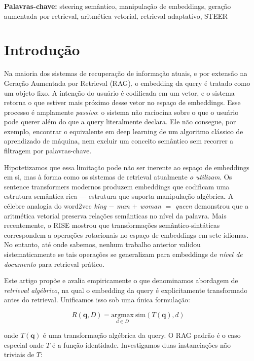 \documentclass{article}
\begin{document}
\noindent\textbf{Palavras-chave:} steering semântico, manipulação de embeddings, geração aumentada por retrieval, aritmética vetorial, retrieval adaptativo, STEER

\section{Introdução}

Na maioria dos sistemas de recuperação de informação atuais, e por extensão na Geração Aumentada por Retrieval (RAG), o embedding da query é tratado como um objeto fixo. A intenção do usuário é codificada em um vetor, e o sistema retorna o que estiver mais próximo desse vetor no espaço de embeddings. Esse processo é amplamente \emph{passivo}: o sistema não raciocina sobre o que o usuário pode querer além do que a query literalmente declara. Ele não consegue, por exemplo, encontrar o equivalente em deep learning de um algoritmo clássico de aprendizado de máquina, nem excluir um conceito semântico sem recorrer a filtragem por palavras-chave.

Hipotetizamos que essa limitação pode não ser inerente ao espaço de embeddings em si, mas à forma como os sistemas de retrieval atualmente \emph{o utilizam}. Os sentence transformers modernos produzem embeddings que codificam uma estrutura semântica rica --- estrutura que suporta manipulação algébrica. A célebre analogia do word2vec \emph{king $-$ man $+$ woman $=$ queen} \cite{mikolov2013} demonstrou que a aritmética vetorial preserva relações semânticas no nível da palavra. Mais recentemente, o RISE \cite{rise2025} mostrou que transformações semântico-sintáticas correspondem a operações rotacionais no espaço de embeddings em sete idiomas. No entanto, até onde sabemos, nenhum trabalho anterior validou sistematicamente se tais operações se generalizam para embeddings de \emph{nível de documento} para retrieval prático.

Este artigo propõe e avalia empiricamente o que denominamos abordagem de \emph{retrieval algébrico}, na qual o embedding da query é explicitamente transformado antes do retrieval. Unificamos isso sob uma única formulação:

\begin{equation}
R(\mathbf{q}, D) = \underset{d \in D}{\text{argmax}} \ \text{sim}(T(\mathbf{q}), d)
\end{equation}

onde $T(\mathbf{q})$ é uma transformação algébrica da query. O RAG padrão é o caso especial onde $T$ é a função identidade. Investigamos duas instanciações não triviais de $T$:
\end{document}
